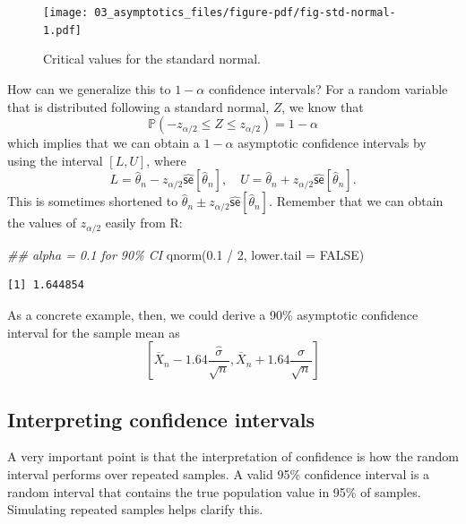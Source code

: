 \documentclass[
  letterpaper,
  DIV=11,
  numbers=noendperiod]{scrreprt}
\newenvironment{Shaded}{\begin{snugshade}}{\end{snugshade}}
\newcommand{\AttributeTok}[1]{\textcolor[rgb]{0.40,0.45,0.13}{#1}}
\newcommand{\ConstantTok}[1]{\textcolor[rgb]{0.56,0.35,0.01}{#1}}
\newcommand{\DecValTok}[1]{\textcolor[rgb]{0.68,0.00,0.00}{#1}}
\newcommand{\DocumentationTok}[1]{\textcolor[rgb]{0.37,0.37,0.37}{\textit{#1}}}
\newcommand{\FloatTok}[1]{\textcolor[rgb]{0.68,0.00,0.00}{#1}}
\newcommand{\FunctionTok}[1]{\textcolor[rgb]{0.28,0.35,0.67}{#1}}
\newcommand{\NormalTok}[1]{\textcolor[rgb]{0.00,0.23,0.31}{#1}}
\newcommand{\SpecialCharTok}[1]{\textcolor[rgb]{0.37,0.37,0.37}{#1}}
\newcommand{\se}{\textsf{se}}
\renewcommand{\P}{\mathbb{P}}
\newcommand{\Xbar}{\overline{X}}
\theoremstyle{plain}
\theoremstyle{definition}
\theoremstyle{definition}
\theoremstyle{remark}
\begin{document}
\begin{figure}[th]

{\centering \texttt{[image: 03\_asymptotics\_files/figure-pdf/fig-std-normal-1.pdf]}

}

\caption{\label{fig-std-normal}Critical values for the standard normal.}

\end{figure}

How can we generalize this to \(1-\alpha\) confidence intervals? For a
random variable that is distributed following a standard normal, \(Z\),
we know that \[ 
\P(-z_{\alpha/2} \leq Z \leq z_{\alpha/2}) = 1-\alpha
\] which implies that we can obtain a \(1-\alpha\) asymptotic confidence
intervals by using the interval \([L, U]\), where \[ 
L = \widehat{\theta}_{n} - z_{\alpha/2} \widehat{\se}[\widehat{\theta}_{n}], \quad U = \widehat{\theta}_{n} + z_{\alpha/2} \widehat{\se}[\widehat{\theta}_{n}]. 
\] This is sometimes shortened to
\(\widehat{\theta}_n \pm z_{\alpha/2} \widehat{\se}[\widehat{\theta}_{n}]\).
Remember that we can obtain the values of \(z_{\alpha/2}\) easily from
R:

\begin{Shaded}
\begin{Highlighting}[]
\DocumentationTok{\#\# alpha = 0.1 for 90\% CI}
\FunctionTok{qnorm}\NormalTok{(}\FloatTok{0.1} \SpecialCharTok{/} \DecValTok{2}\NormalTok{, }\AttributeTok{lower.tail =} \ConstantTok{FALSE}\NormalTok{)}
\end{Highlighting}
\end{Shaded}

\begin{verbatim}
[1] 1.644854
\end{verbatim}

As a concrete example, then, we could derive a 90\% asymptotic
confidence interval for the sample mean as \[ 
\left[\Xbar_{n} - 1.64 \frac{\widehat{\sigma}}{\sqrt{n}}, \Xbar_{n} + 1.64 \frac{\widehat{\sigma}}{\sqrt{n}}\right]
\]

\hypertarget{interpreting-confidence-intervals}{%
\subsection{Interpreting confidence
intervals}\label{interpreting-confidence-intervals}}

A very important point is that the interpretation of confidence is how
the random interval performs over repeated samples. A valid 95\%
confidence interval is a random interval that contains the true
population value in 95\% of samples. Simulating repeated samples helps
clarify this.
\end{document}

